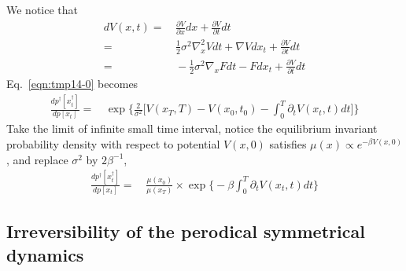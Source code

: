 \documentclass[aps, pre, preprint,unsortedaddress,a4paper,onecolumn]{revtex4}
\newcommand{\mymu}{\mu}
\begin{document}
We notice that
\begin{align}\nonumber
  dV(x, t) = &\, \frac{\partial V}{\partial x} dx + \frac{\partial V}{\partial t} dt\\\nonumber
  =&\,
  \frac12 \sigma^2 \nabla^2_x V dt +  \nabla V dx_t + \frac{\partial V}{\partial t} dt \\
  =&\,
  -\frac12 \sigma^2 \nabla_x F dt -  F dx_t + \frac{\partial V}{\partial t} dt
\end{align}
Eq.~\eqref{eqn:tmp14-0} becomes
\begin{align}
  \frac{  dp^\dagger[x^\dagger_t] }{ dp[x_t]}
  =&\,
  \exp\bigg\{
  \frac2{\sigma^2}\bigg[
  V(x_T,T) - V(x_0,t_0) - \int_0^T\partial_tV(x_t,t)dt
  \bigg]
  \bigg\}
\end{align}
Take the limit of infinite small time interval, notice the equilibrium
invariant probability density with respect to potential $V(x,0)$ satisfies $\mymu(x) \propto e^{-\beta V(x,0)}$, and replace $\sigma^2$ by $2\beta^{-1}$,
\begin{align}
  \frac{  dp^\dagger[x^\dagger_t] }{ dp[x_t]}
  =&\,
  \frac{\mymu(x_0)}{\mymu(x_T)}\times
  \exp\bigg\{
  - \beta\int_0^T\partial_tV(x_t,t)dt
  \bigg\}
\end{align}

\subsection{Irreversibility of the perodical symmetrical dynamics}
\end{document}
